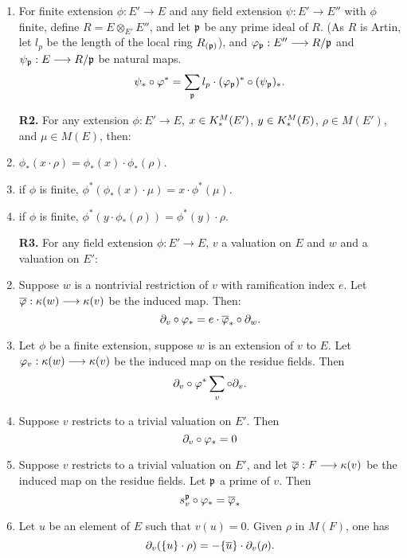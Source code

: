 \begin{defn}
\begin{enumerate}[label=\bfseries R1\alph*., leftmargin=3em]
\item For finite extension $\phi: E' \to E$ and any 
field extension $\psi: E' \to E''$ with $\phi$ finite, define $R = E 
\otimes_{E'} E''$, and let $\mathfrak{p}$ be any prime ideal of $R$. (As 
$R$ is Artin, let $l_p$ be the length of the local ring 
$R_{(\mathfrak{p})}$), and $\varphi_{\mathfrak{p}}: E'' \longrightarrow R/{\mathfrak{p}}$ 
and $\psi_{\mathfrak{p}}: E \longrightarrow R/{\mathfrak{p}}$ be natural maps.
\[
\psi_*\circ \varphi^* = \sum_{\mathfrak{p}} l_p \cdot 
(\varphi_{\mathfrak{p}})^* \circ (\psi_{\mathfrak{p}})_*.
\]
\end{enumerate}
\begin{enumerate}[label=\bfseries R2\alph*., leftmargin=3em]
\item[\textbf{R2.}] For any extension $\phi: E' \to E$, $x \in 
K^M_*(E')$, $y \in K^M_*(E)$, $\rho \in M(E')$, and $\mu \in 
M(E)$, then:

\item $\phi_*(x \cdot \rho) = \phi_*(x) \cdot 
\phi_*(\rho)$.

\item if $\phi$ is finite, $\phi^*(\phi_*(x) \cdot 
\mu) = x \cdot \phi^*(\mu)$.

\item if $\phi$ is finite, $\phi^*(y \cdot 
\phi_*(\rho)) = \phi^*(y) \cdot \rho$.
\end{enumerate}
\begin{enumerate}[label=\bfseries R3\alph*., leftmargin=3em]
\item[\textbf{R3.}] For any field extension $\phi: E' \to E$, $v$ 
a valuation on $E$ and $w$ and a valuation on $E'$:

\item Suppose $w$ is a nontrivial restriction of 
$v$ with ramification index $e$. Let $\overline{\varphi}: \kappa(w) \longrightarrow 
\kappa(v)$ be the induced map. Then:
\[
\partial_{v} \circ \varphi_* = e \cdot \overline{\varphi}_* \circ \partial_{w}.
\]

\item Let $\phi$ be a finite extension, suppose
$w$ is an extension of $v$ to $E$. Let $\varphi_v: \kappa(w) \longrightarrow 
\kappa(v)$ be the induced map on the residue fields. Then
\[
\partial_{v} \circ \varphi^* \sum_{v} \circ \partial_{v}.
\]

\item Suppose $v$ restricts to a trivial valuation 
on $E'$. Then
\[
\partial_{v} \circ \varphi_* = 0
\]

\item Suppose $v$ restricts to a trivial valuation 
on $E'$, and let $\overline{\varphi}: F \longrightarrow \kappa(v)$ be the induced map on 
the residue fields. Let $\mathfrak{p}$ a prime of $v$. Then
\[
s_{v}^{\mathfrak{p}} \circ \varphi_* = \overline{\varphi}_*
\]

\item Let $u$ be an element of $E$ such that 
$v(u) = 0$. Given $\rho$ in $M(F)$, one has
\[
\partial_{v}(\{u\} \cdot \rho) = -\{\overline{u}\} \cdot \partial_{v}(\rho).
\]
\end{enumerate}
\end{defn}


